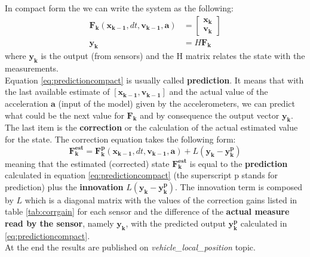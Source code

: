 \noindent
In compact form the we can write the system as the following:
\begin{equation}
	\begin{aligned}
	\boldsymbol{F_k}(\boldsymbol{x_{k-1}}, dt ,\boldsymbol{v_{k-1}}, \boldsymbol{a})& = \begin{bmatrix}\boldsymbol{x_k}\\\boldsymbol{v_k}\end{bmatrix}\\
	\boldsymbol{y_k}& = H \boldsymbol{F_k}
	\end{aligned}
	\label{eq:predictioncompact}
	\end{equation}
where $\boldsymbol{y_k}$ is the output  (from sensors) and the H matrix relates the state with the measurements. \\

\noindent
Equation \ref{eq:predictioncompact} is usually called \textbf{prediction}. It means that with the last available estimate of  $[\boldsymbol{x_{k-1}},\boldsymbol{v_{k-1}}]$ and the actual value of the acceleration $\boldsymbol{a}$ (input of the model) given by the accelerometers, we can predict what could be the next value for $\boldsymbol{F_k}$ and by consequence the output vector $\boldsymbol{y_k}$. \\

\noindent
The last item is the \textbf{correction} or the calculation of the actual estimated value for the state. The correction equation takes the following form:
\begin{equation}
	\boldsymbol{F_k^{est}} = \boldsymbol{F_k^p}(\boldsymbol{x_{k-1}}, dt ,\boldsymbol{v_{k-1}}, \boldsymbol{a}) + L(\boldsymbol{y_k} - \boldsymbol{y_k^p})
	\label{eq:observer}
\end{equation}
meaning that the estimated (corrected) state $\boldsymbol{F_k^{est}}$ is equal to the \textbf{prediction} calculated in equation \ref{eq:predictioncompact} (the superscript p stands for prediction) plus the \textbf{innovation} $L(\boldsymbol{y_k} - \boldsymbol{y_k^p})$. The innovation term is composed by $L$ which is a diagonal matrix with the values of the correction gains listed in table \ref{tab:corrgain} for each sensor and the difference of the \textbf{actual measure read by the sensor}, namely $\boldsymbol{y_k}$, with the predicted output $\boldsymbol{y_k^p}$ calculated in \ref{eq:predictioncompact}. \\

\noindent
At the end the results are  published on \textit{vehicle\_local\_position} topic.

